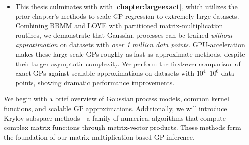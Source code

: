 \begin{itemize}
  \item This thesis culminates with with {\bf \cref{chapter:largeexact}}, which utilizes the prior chapter's methods to scale GP regression to extremely large datasets.
    Combining BBMM and LOVE with partitioned matrix-multiplication routines, we demonstrate that Gaussian processes can be trained \emph{without approximation} on datasets with \emph{over 1 million data points}.
    GPU-acceleration makes these large-scale GPs roughly as fast as approximate methods, despite their larger asymptotic complexity.
    We perform the first-ever comparison of exact GPs against scalable approximations on datasets with $10^4$--$10^6$ data points, showing dramatic performance improvements.

\end{itemize}

\noindent
We begin with a brief overview of Gaussian process models, common kernel functions, and scalable GP approximations.
Additionally, we will introduce Krylov-subspace methods---a family of numerical algorithms that compute complex matrix functions through matrix-vector products.
These methods form the foundation of our matrix-multiplication-based GP inference.




